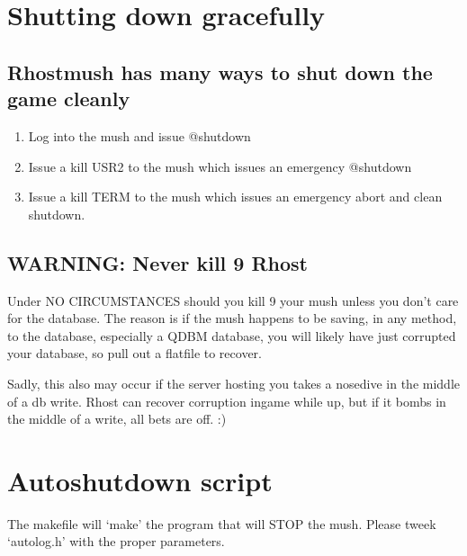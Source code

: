 \documentclass[letterpaper,10pt,english]{sphinxmanual}
\begin{document}
\section{Shutting down gracefully}
\label{\detokenize{maintenance:shutting-down-gracefully}}

\subsection{Rhostmush has many ways to shut down the game cleanly}
\label{\detokenize{maintenance:rhostmush-has-many-ways-to-shut-down-the-game-cleanly}}\begin{enumerate}
%
\item {} 
\sphinxAtStartPar
Log into the mush and issue @shutdown

\item {} 
\sphinxAtStartPar
Issue a kill \sphinxhyphen{}USR2 to the mush which issues an emergency @shutdown

\item {} 
\sphinxAtStartPar
Issue a kill \sphinxhyphen{}TERM to the mush which issues an emergency abort and clean shutdown.

\end{enumerate}


\subsection{WARNING: Never kill \sphinxhyphen{}9 Rhost}
\label{\detokenize{maintenance:warning-never-kill-9-rhost}}
\sphinxAtStartPar
Under NO CIRCUMSTANCES should you kill \sphinxhyphen{}9 your mush unless you don’t care for the
database.  The reason is if the mush happens to be saving, in any method, to the
database, especially a QDBM database, you will likely have just corrupted your
database, so pull out a flatfile to recover.

\sphinxAtStartPar
Sadly, this also may occur if the server hosting you takes a nose\sphinxhyphen{}dive in the middle
of a db write.  Rhost can recover corruption in\sphinxhyphen{}game while up, but if it bombs
in the middle of a write, all bets are off. :)


\section{Autoshutdown script}
\label{\detokenize{maintenance:autoshutdown-script}}
\sphinxAtStartPar
The makefile will ‘make’ the program that will STOP the mush.
Please tweek ‘autolog.h’ with the proper parameters.
\end{document}
